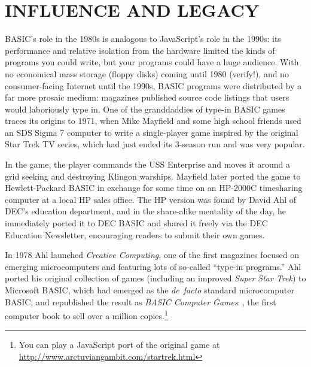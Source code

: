 

\section{INFLUENCE AND LEGACY}


BASIC's role in the 1980s is analogous to JavaScript's role in the
1990s: its performance and relative isolation from the hardware limited
the kinds of programs you could write, but your programs could have a
huge audience.
With no economical mass storage (floppy disks) coming until 1980 (verify!), and no
consumer-facing Internet until the 1990s, BASIC programs were
distributed by a far more prosaic medium: magazines published source
code listings that users would laboriously type in.
One of the granddaddies of type-in BASIC games traces its origins to
1971, when Mike Mayfield and some high school friends used an SDS Sigma
7 computer to write a single-player game inspired by the original Star
Trek TV series, which had just ended its 3-season run and was very
popular.

In the game, the player commands the USS Enterprise and moves it around
a grid seeking and destroying Klingon warships.
Mayfield later ported the game to Hewlett-Packard BASIC in exchange for
some time on an HP-2000C timesharing computer at a local HP sales
office.
The HP version was found by David Ahl of DEC's education department, and
in the share-alike mentality of the day, he immediately ported it to DEC
BASIC and shared it freely via the DEC Education
Newsletter, encouraging readers to submit their own games.

In 1978 Ahl launched \emph{Creative Computing}, one of the first
magazines focused on emerging microcomputers and featuring lots of
so-called ``type-in programs.''
Ahl ported his original collection of games (including an improved
\emph{Super Star Trek}) to Microsoft BASIC, which had emerged as the
\emph{de~facto} standard microcomputer BASIC, and republished the result
as \emph{BASIC Computer Games}~\cite{basic_computer_games}, the first
computer book to sell over a million copies.\footnote{You can play a
  JavaScript port of the original game at \url{http://www.arctuviangambit.com/startrek.html}}

